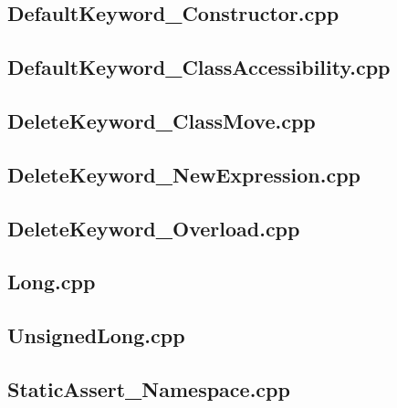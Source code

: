 \documentclass[11pt]{report}
\begin{document}
\begin{appendix}
\subsection{DefaultKeyword\_Constructor.cpp}
\label{DefaultKeyword_Constructor}


\subsection{DefaultKeyword\_ClassAccessibility.cpp}
\label{DefaultKeyword_ClassAccessibility}


\subsection{DeleteKeyword\_ClassMove.cpp}
\label{DeleteKeyword_ClassMove}


\subsection{DeleteKeyword\_NewExpression.cpp}
\label{DeleteKeyword_NewExpression}


\subsection{DeleteKeyword\_Overload.cpp}
\label{DeleteKeyword_Overload}


\subsection{Long.cpp}
\label{Long}


\subsection{UnsignedLong.cpp}
\label{UnsignedLong}


\subsection{StaticAssert\_Namespace.cpp}
\label{StaticAssert_Namespace}



\end{appendix}
\end{document}
